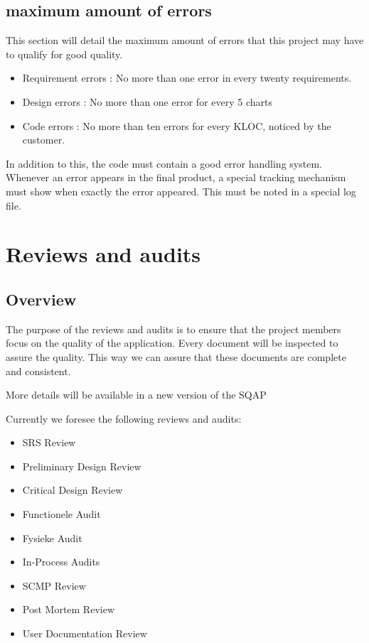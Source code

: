 \documentclass[salesmen, twoside]{softproj}
\begin{document}
\begin{projdoc}
\section{maximum amount of errors}
This section will detail the maximum amount of errors that this project may have to qualify for good quality.
\begin{itemize}
\item Requirement errors : No more than one error in every twenty requirements.
\item Design errors : No more than one error for every 5 charts
\item Code errors : No more than ten errors for every KLOC, noticed by the customer.
\end{itemize}
In addition to this, the code must contain a good error handling system. Whenever an error appears in the final product, a special tracking mechanism must show when exactly the error appeared. This must be noted in a special log file.

\chapter{Reviews and audits}
\section{Overview}
The purpose of the reviews and audits is to ensure that the project members focus on the quality of the application. Every document will be inspected to assure the quality. This way we can assure that these documents are complete and consistent.

More details will be available in a new version of the SQAP

Currently we foresee the following reviews and audits:
\begin{itemize}
\item
SRS Review
\item
Preliminary Design Review
\item
Critical Design Review
\item
Functionele Audit
\item
Fysieke Audit
\item
In-Process Audits
\item
SCMP Review
\item
Post Mortem Review
\item
User Documentation Review
\end{itemize}

\begin{comment}

\end{comment}
\end{projdoc}
\end{document}
